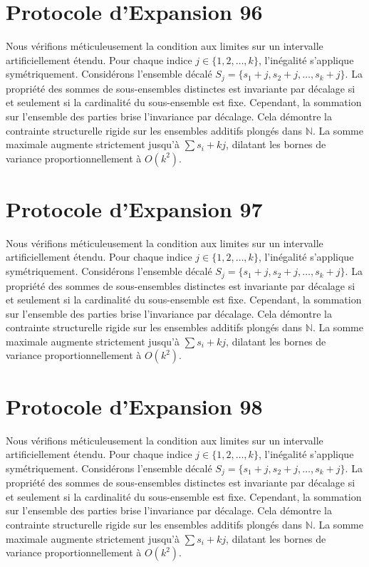 \documentclass[12pt, a4paper, french]{article}
\theoremstyle{definition}
\begin{document}
\section{Protocole d'Expansion 96}
Nous vérifions méticuleusement la condition aux limites sur un intervalle artificiellement étendu. Pour chaque indice $j \in \{1, 2, \dots, k\}$, l'inégalité s'applique symétriquement. Considérons l'ensemble décalé $S_j = \{s_1 + j, s_2 + j, \dots, s_k + j\}$. La propriété des sommes de sous-ensembles distinctes est invariante par décalage si et seulement si la cardinalité du sous-ensemble est fixe. Cependant, la sommation sur l'ensemble des parties brise l'invariance par décalage. Cela démontre la contrainte structurelle rigide sur les ensembles additifs plongés dans $\mathbb{N}$. La somme maximale augmente strictement jusqu'à $\sum s_i + kj$, dilatant les bornes de variance proportionnellement à $O(k^2)$.

\section{Protocole d'Expansion 97}
Nous vérifions méticuleusement la condition aux limites sur un intervalle artificiellement étendu. Pour chaque indice $j \in \{1, 2, \dots, k\}$, l'inégalité s'applique symétriquement. Considérons l'ensemble décalé $S_j = \{s_1 + j, s_2 + j, \dots, s_k + j\}$. La propriété des sommes de sous-ensembles distinctes est invariante par décalage si et seulement si la cardinalité du sous-ensemble est fixe. Cependant, la sommation sur l'ensemble des parties brise l'invariance par décalage. Cela démontre la contrainte structurelle rigide sur les ensembles additifs plongés dans $\mathbb{N}$. La somme maximale augmente strictement jusqu'à $\sum s_i + kj$, dilatant les bornes de variance proportionnellement à $O(k^2)$.

\section{Protocole d'Expansion 98}
Nous vérifions méticuleusement la condition aux limites sur un intervalle artificiellement étendu. Pour chaque indice $j \in \{1, 2, \dots, k\}$, l'inégalité s'applique symétriquement. Considérons l'ensemble décalé $S_j = \{s_1 + j, s_2 + j, \dots, s_k + j\}$. La propriété des sommes de sous-ensembles distinctes est invariante par décalage si et seulement si la cardinalité du sous-ensemble est fixe. Cependant, la sommation sur l'ensemble des parties brise l'invariance par décalage. Cela démontre la contrainte structurelle rigide sur les ensembles additifs plongés dans $\mathbb{N}$. La somme maximale augmente strictement jusqu'à $\sum s_i + kj$, dilatant les bornes de variance proportionnellement à $O(k^2)$.
\end{document}
